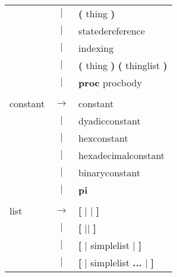 \begin{tabular}{lcl}
 & $|$ & \textbf{(} thing \textbf{)} \\
 & $|$ & statedereference \\
 & $|$ & indexing \\
 & $|$ & \textbf{(} thing \textbf{)} \textbf{(} thinglist \textbf{)} \\
 & $|$ & \textbf{proc} procbody \\
 & & \\
constant & $\rightarrow$ & constant \\
 & $|$ & dyadicconstant \\
 & $|$ & hexconstant \\
 & $|$ & hexadecimalconstant \\
 & $|$ & binaryconstant \\
 & $|$ & \textbf{pi} \\
 & & \\
list & $\rightarrow$ & \textbf{[} \textbf{$|$} \textbf{$|$} \textbf{]} \\
 & $|$ & \textbf{[} \textbf{$|$$|$} \textbf{]} \\
 & $|$ & \textbf{[} \textbf{$|$} simplelist \textbf{$|$} \textbf{]} \\
 & $|$ & \textbf{[} \textbf{$|$} simplelist \textbf{...} \textbf{$|$} \textbf{]} \\
\end{tabular}\\
